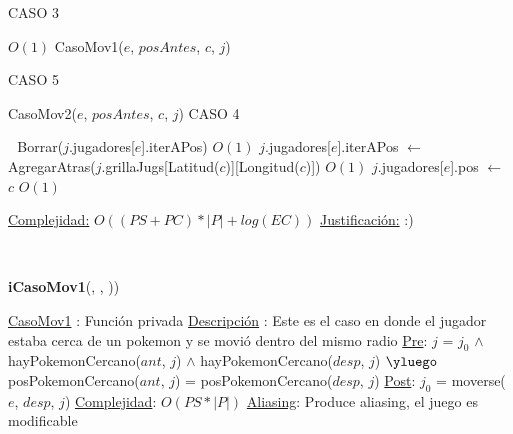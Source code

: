 \begin{Algoritmos}
\begin{algorithmic}[1]
	\Statex $ $
	
	
			\State CASO 3
					
		\Else %
			  \Comment $O(1)$
				\State CasoMov1($e$, $posAntes$, $c$, $j$)
			\Else

				\State CASO 5			
			\EndIf		
		\EndIf
	\Else %
			
			\State CasoMov2($e$, $posAntes$, $c$, $j$)
		\Else
			\State CASO 4
		\EndIf		
		
	\EndIf
	
	\Statex $ $
	\Statex $ $
	\State Borrar($j$.jugadores[$e$].iterAPos) \Comment $O(1)$
	\State $j$.jugadores[$e$].iterAPos $\gets$ AgregarAtras($j$.grillaJugs[Latitud($c$)][Longitud($c$)]) \Comment $O(1)$
	\State $j$.jugadores[$e$].pos $\gets$ $c$ \Comment $O(1)$	
	
\EndIf

\medskip
\State \underline{Complejidad:} $O((PS + PC)*|P| + log(EC))$ 
\State \underline{Justificaci\'on:} :)

\end{algorithmic}



$ $\newline
$ $\newline

{\textbf{iCasoMov1}(,  , ))}
\begin{algorithmic}[1]

\Statex \underline{CasoMov1} : Funci\'on privada 
\Statex \underline{Descripci\'on} : Este es el caso en donde el jugador estaba cerca de un pokemon y se movi\'o dentro del mismo radio 
\Statex \underline{Pre}: $j$ = $j_0$ $\land$ hayPokemonCercano($ant$, $j$) $\land$ hayPokemonCercano($desp$, $j$) $\yluego$ posPokemonCercano($ant$, $j$) = posPokemonCercano($desp$, $j$) 
\Statex \underline{Post}: $j_0$ = moverse($e$, $desp$, $j$) 
\Statex \underline{Complejidad}: $O(PS *|P|)$ 
\Statex \underline{Aliasing}: Produce aliasing, el juego es modificable


\end{algorithmic}
\end{Algoritmos}
